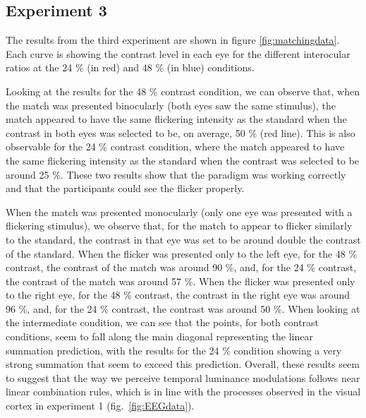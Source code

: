 \documentclass[
]{article}
\begin{document}
\hypertarget{experiment-3-1}{%
\subsection{Experiment 3}\label{experiment-3-1}}

The results from the third experiment are shown in figure \ref{fig:matchingdata}. Each curve is showing the contrast level in each eye for the different interocular ratios at the 24 \% (in red) and 48 \% (in blue) conditions.

Looking at the results for the 48 \% contrast condition, we can observe that, when the match was presented binocularly (both eyes saw the same stimulus), the match appeared to have the same flickering intensity as the standard when the contrast in both eyes was selected to be, on average, 50 \% (red line). This is also observable for the 24 \% contrast condition, where the match appeared to have the same flickering intensity as the standard when the contrast was selected to be around 25 \%. These two results show that the paradigm was working correctly and that the participants could see the flicker properly.

When the match was presented monocularly (only one eye was presented with a flickering stimulus), we observe that, for the match to appear to flicker similarly to the standard, the contrast in that eye was set to be around double the contrast of the standard. When the flicker was presented only to the left eye, for the 48 \% contrast, the contrast of the match was around 90 \%, and, for the 24 \% contrast, the contrast of the match was around 57 \%. When the flicker was presented only to the right eye, for the 48 \% contrast, the contrast in the right eye was around 96 \%, and, for the 24 \% contrast, the contrast was around 50 \%. When looking at the intermediate condition, we can see that the points, for both contrast conditions, seem to fall along the main diagonal representing the linear summation prediction, with the results for the 24 \% condition showing a very strong summation that seem to exceed this prediction. Overall, these results seem to suggest that the way we perceive temporal luminance modulations follows near linear combination rules, which is in line with the processes observed in the visual cortex in experiment 1 (fig.~\ref{fig:EEGdata}).
\end{document}
